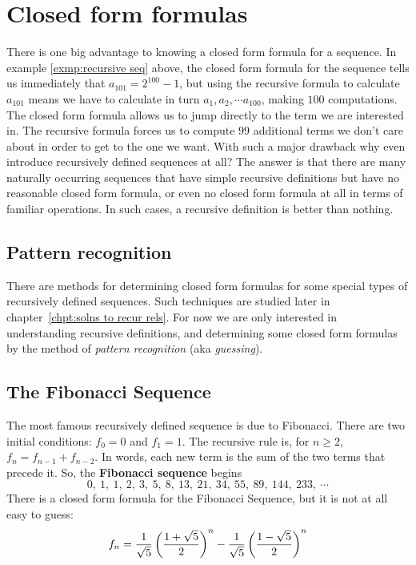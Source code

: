 \section{Closed form formulas}
There is one big advantage to knowing a closed form formula for a sequence.
In  example \ref{exmp:recursive seq} above, the closed form formula for the sequence tells us
immediately that $a_{101} = 2^{100}-1$, but using the recursive formula
to calculate $a_{101}$  means we have to calculate in turn $a_1,a_2,\cdots a_{100}$,
making $100$ computations. The closed form formula allows us to jump directly
to the term we are interested in.  The recursive formula forces us to compute
$99$ additional terms we don't care about in order to get to the one we want. 
With such a
major drawback why even introduce recursively defined sequences at all? The answer
is that there are many naturally occurring sequences that have simple recursive 
definitions but have no reasonable closed form formula, or even no closed form formula 
at all in terms of familiar operations. In such cases, a recursive definition is better than nothing.

\subsection{Pattern recognition}
There are methods for determining closed form formulas for some special 
types of recursively defined sequences. Such techniques are  studied 
later in chapter~\ref{chpt:solns to recur rels}.
For now we are only interested in  understanding recursive definitions, and 
determining some closed form formulas by the method of 
\emph{pattern recognition} (aka \emph{guessing}).

\subsection{The Fibonacci Sequence}
The most famous recursively defined sequence is due to Fibonacci. There
are two initial conditions: $f_0 = 0$ and $f_1=1$. %
 The recursive rule is,
for $n\geq 2$, $f_n = f_{n-1}+f_{n-2}$. In words, each new term is the sum
of the two terms that precede it. So, the {\bfseries Fibonacci sequence} begins 
\[
0,\ 1,\ 1,\ 2,\ 3,\ 5,\ 8,\ 13,\ 21,\ 34,\ 55,\ 89,\ 144,\ 233,\ \cdots
\]
There is a closed form formula for the Fibonacci Sequence, 
but it is not at all easy to guess:
\[
f_n = {1\over{\sqrt5}}\left({1+\sqrt{5}}\over 2\right)^n 
-{1\over{\sqrt5}}\left({1-\sqrt{5}}\over 2\right)^n
\]
 
